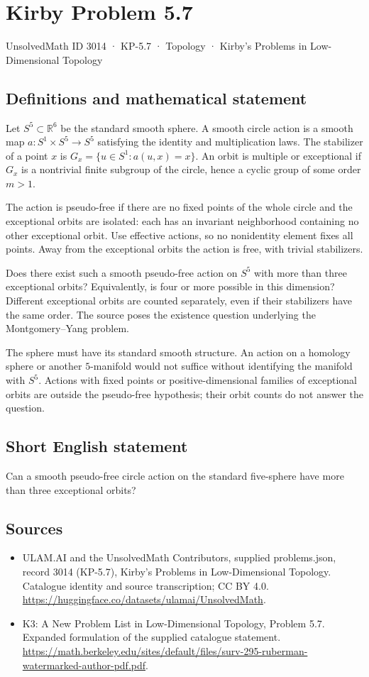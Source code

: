 \documentclass[11pt,a4paper]{article}
\begin{document}
\section*{Kirby Problem 5.7}\label{3014}
{\small UnsolvedMath ID 3014 · KP-5.7 · Topology · Kirby's Problems in Low-Dimensional Topology}
\subsection{Definitions and mathematical statement}
Let $S^5\subset\mathbb R^6$ be the standard smooth sphere.
A smooth circle action is a smooth map
$a:S^1\times S^5\to S^5$ satisfying the identity and
multiplication laws. The stabilizer of a point $x$ is
$G_x=\{u\in S^1:a(u,x)=x\}$. An orbit is multiple or
exceptional if $G_x$ is a nontrivial finite subgroup of the
circle, hence a cyclic group of some order $m>1$.

The action is pseudo-free if there are no fixed points of the
whole circle and the exceptional orbits are isolated: each has
an invariant neighborhood containing no other exceptional orbit.
Use effective actions, so no nonidentity element fixes all points.
Away from the exceptional orbits the action is free, with
trivial stabilizers.

Does there exist such a smooth pseudo-free action on $S^5$
with more than three exceptional orbits? Equivalently, is four
or more possible in this dimension? Different exceptional orbits
are counted separately, even if their stabilizers have the same
order. The source poses the existence question underlying the
Montgomery--Yang problem.

The sphere must have its standard smooth structure. An action
on a homology sphere or another $5$-manifold would not suffice
without identifying the manifold with $S^5$. Actions with fixed
points or positive-dimensional families of exceptional orbits
are outside the pseudo-free hypothesis; their orbit counts do
not answer the question.
\subsection{Short English statement}
Can a smooth pseudo-free circle action on the standard five-sphere have more than three exceptional orbits?
\subsection{Sources}
\begin{itemize}
\item[S1] ULAM.AI and the UnsolvedMath Contributors, supplied problems.json, record 3014 (KP-5.7), Kirby's Problems in Low-Dimensional Topology. Catalogue identity and source transcription; CC BY 4.0.
\url{https://huggingface.co/datasets/ulamai/UnsolvedMath}.
\item[S2] K3: A New Problem List in Low-Dimensional Topology, Problem 5.7. Expanded formulation of the supplied catalogue statement.
\url{https://math.berkeley.edu/sites/default/files/surv-295-ruberman-watermarked-author-pdf.pdf}.
\end{itemize}
\end{document}
